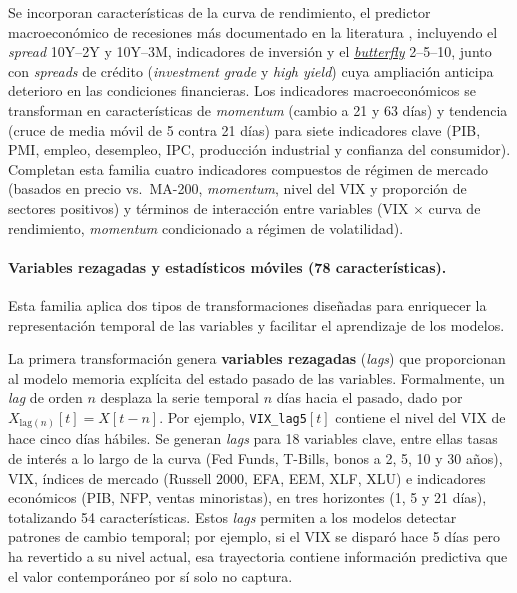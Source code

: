 Se incorporan caracter\'isticas de la curva de rendimiento, el predictor macroecon\'omico de recesiones m\'as documentado en la literatura \citep{harvey1989}, incluyendo el \textit{spread} 10Y--2Y y 10Y--3M, indicadores de inversi\'on y el \hyperlink{glos:butterfly}{\textit{butterfly}} 2--5--10, junto con \textit{spreads} de cr\'edito (\textit{investment grade} y \textit{high yield}) cuya ampliaci\'on anticipa deterioro en las condiciones financieras. Los indicadores macroecon\'omicos se transforman en caracter\'isticas de \textit{momentum} (cambio a 21 y 63 d\'ias) y tendencia (cruce de media m\'ovil de 5 contra 21 d\'ias) para siete indicadores clave (PIB, PMI, empleo, desempleo, IPC, producci\'on industrial y confianza del consumidor). Completan esta familia cuatro indicadores compuestos de r\'egimen de mercado (basados en precio vs.\ MA-200, \textit{momentum}, nivel del VIX y proporci\'on de sectores positivos) y t\'erminos de interacci\'on entre variables (VIX $\times$ curva de rendimiento, \textit{momentum} condicionado a r\'egimen de volatilidad).

\paragraph{Variables rezagadas y estad\'isticos m\'oviles (78 caracter\'isticas).}
Esta familia aplica dos tipos de transformaciones dise\~nadas para enriquecer la representaci\'on temporal de las variables y facilitar el aprendizaje de los modelos.

La primera transformaci\'on genera \textbf{variables rezagadas} (\textit{lags}) que proporcionan al modelo memoria expl\'icita del estado pasado de las variables. Formalmente, un \textit{lag} de orden $n$ desplaza la serie temporal $n$ d\'ias hacia el pasado, dado por $X_{\text{lag}(n)}[t] = X[t-n]$. Por ejemplo, \texttt{VIX\_lag5}$[t]$ contiene el nivel del VIX de hace cinco d\'ias h\'abiles. Se generan \textit{lags} para 18 variables clave, entre ellas tasas de inter\'es a lo largo de la curva (Fed Funds, T-Bills, bonos a 2, 5, 10 y 30 a\~nos), VIX, \'indices de mercado (Russell 2000, EFA, EEM, XLF, XLU) e indicadores econ\'omicos (PIB, NFP, ventas minoristas), en tres horizontes (1, 5 y 21 d\'ias), totalizando 54 caracter\'isticas. Estos \textit{lags} permiten a los modelos detectar patrones de cambio temporal; por ejemplo, si el VIX se dispar\'o hace 5 d\'ias pero ha revertido a su nivel actual, esa trayectoria contiene informaci\'on predictiva que el valor contempor\'aneo por s\'i solo no captura.

